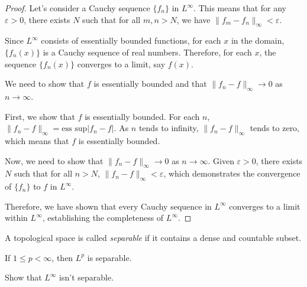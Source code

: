 \begin{proof}
    Let's consider a Cauchy sequence $\{f_n\}$ in $L^\infty$. 
    This means that for any $\varepsilon > 0$, there exists 
    $N$ such that for all $m,n > N$, we have 
    $\|f_m - f_n\|_\infty < \varepsilon$.

    Since $L^\infty$ consists of essentially bounded functions, 
    for each $x$ in the domain, $\{f_n(x)\}$ is a Cauchy 
    sequence of real numbers. Therefore, for each $x$, 
    the sequence $\{f_n(x)\}$ converges to a limit, 
    say $f(x)$.

    We need to show that $f$ is essentially bounded and 
    that $\|f_n - f\|_\infty \rightarrow 0$ as 
    $n \rightarrow \infty$. 

    First, we show that $f$ is essentially bounded. 
    For each $n$, $\|f_n - f\|_\infty = \text{ess sup} 
    |f_n - f|$. As $n$ tends to infinity, 
    $\|f_n - f\|_\infty$ tends to zero, which means that 
    $f$ is essentially bounded.

    Now, we need to show that $\|f_n - f\|_\infty 
    \rightarrow 0$ as $n \rightarrow \infty$. Given 
    $\varepsilon > 0$, there exists $N$ such that for all 
    $n > N$, $\|f_n - f\|_\infty < \varepsilon$, 
    which demonstrates the convergence of $\{f_n\}$ to 
    $f$ in $L^\infty$.

    Therefore, we have shown that every Cauchy sequence in 
    $L^\infty$ converges to a limit within $L^\infty$, 
    establishing the completeness of $L^\infty$.
\end{proof}
\begin{defn}[Separable]
    A topological space is called 
    \textit{separable} if it contains a 
    dense and countable subset.
\end{defn}
\begin{thm}
    If $1\le p<\infty$, then $L^{p}$ is separable.
\end{thm}
\begin{exc}
    Show that $L^{\infty}$ isn't separable.
\end{exc}
